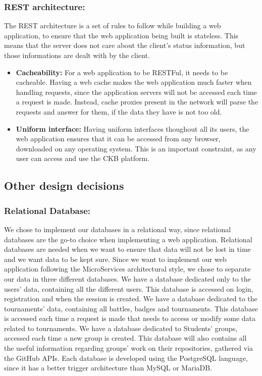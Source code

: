\documentclass{article}
\begin{document}
{    \subsubsection{REST architecture:}
    The REST architecture is a set of rules to follow while building a web application, to ensure that the web application being built is stateless.
    This means that the server does not care about the client's status information, but those informations are dealt with by the client.
    \begin{itemize}
    \item \textbf{Cacheability:} For a web application to be RESTFul, it needs to be cacheable. Having a web cache makes the web application much faster when handling 
    requests, since the application servers will not be accessed each time a request is made. Instead, cache proxies present in the network will parse the requests and
    answer for them, if the data they have is not too old.
    \item \textbf{Uniform interface:} Having uniform interfaces thoughout all its users, the web application ensures that it can be accessed from any browser, downloaded
    on any operating system. This is an important constraint, as any user can access and use the CKB platform.
    \end{itemize}
\subsection{Other design decisions}
    \subsubsection{Relational Database:} We chose to implement our databases in a relational way, since relational databases are the go-to choice when 
    implementing a web application. Relational databases are needed when we want to ensure that data will not be lost in time and we want data to be kept sure.
    Since we want to implement our web application following the MicroServices architectural style, we chose to separate our data in three different databases.
    We have a database dedicated only to the users' data, containing all the different users. This database is accessed on login, registration and when the 
    session is created.
    We have a database dedicated to the tournaments' data, containing all battles, badges and tournaments. This database is accessed each time a request 
    is made that needs to access or modify some data related to tournaments.
    We have a database dedicated to Students' groups, accessed each time a new group is created. This database will also contains all the
    useful information regarding groups' work on their repositories, gathered via the GitHub APIs.
    Each database is developed using the PostgreSQL language, since it has a better trigger architecture than MySQL or MariaDB.

}
\end{document}
